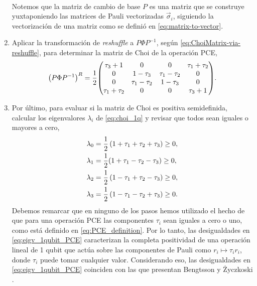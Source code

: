 \begin{enumerate}
\begin{align}
	\end{align}
	Notemos que la matriz de cambio de base $P$ es una matriz 
	que se construye yuxtaponiendo las matrices de Pauli 
	vectorizadas $\vec{\sigma}_i$, 
	siguiendo la vectorización de una matriz como se definió en 
	\eqref{eq:matrix-to-vector}.
	\item Aplicar la transformación de \textit{reshuffle} a $P\Phi P^{-1}$,  
	según \eqref{eq:ChoiMatrix-via-reshuffle}, para 
	determinar la matriz de Choi de la operación PCE,
	\begin{align}\label{eq:choi_1q}
		\qty(P \Phi P^{-1})^R=
		\frac{1}{2}\mqty(
		\tau _3+1 & 0 & 0 & \tau _1+\tau _2 \\
		0 & 1-\tau _3 & \tau _1-\tau _2 & 0 \\
		0 & \tau _1-\tau _2 & 1-\tau _3 & 0 \\
		\tau _1+\tau _2 & 0 & 0 & \tau _3+1 
		).
	\end{align}
	\item Por último, para evaluar si la matriz de Choi es positiva semidefinida, 
	calcular los eigenvalores $\lambda_i$ de \eqref{eq:choi_1q} y revisar que 
	todos sean 	iguales o mayores a cero,
	\begin{subequations}\label{eq:eigv_1qubit_PCE}
		\begin{align}
			\lambda_0=\frac{1}{2}& \left(1+\tau _1+\tau _2+\tau _3\right)\geq0, \\
			\lambda_1=\frac{1}{2}& \qty(1+\tau _1-\tau _2-\tau _3)\geq0, \\
			\lambda_2=\frac{1}{2}& \left(1-\tau _1+\tau _2-\tau _3\right)\geq0, \\
			\lambda_3=\frac{1}{2}& \left(1-\tau _1-\tau _2+\tau _3\right)\geq0.
		\end{align}
	\end{subequations}
	Debemos remarcar que en ninguno de los pasos hemos utilizado el hecho de que
	para una operación PCE las componentes $\tau_i$ sean iguales a cero o uno,
	como está definido en \eqref{eq:PCE_definition}. Por lo tanto, las 
	desigualdades en \eqref{eq:eigv_1qubit_PCE} caracterizan la completa 
	positividad de una operación lineal de 1 qubit que actúa sobre las
	componentes de Pauli como $r_i\longmapsto \tau_ir_i$, donde $\tau_i$
	puede tomar cualquier valor. Considerando eso, 
	las desigualdades en \eqref{eq:eigv_1qubit_PCE} coinciden con las 
	que presentan 	Bengtsson y Życzkoski
	 \cite[pág. 292]{bengtsson_zyczkowski_2017}.
\end{enumerate}

